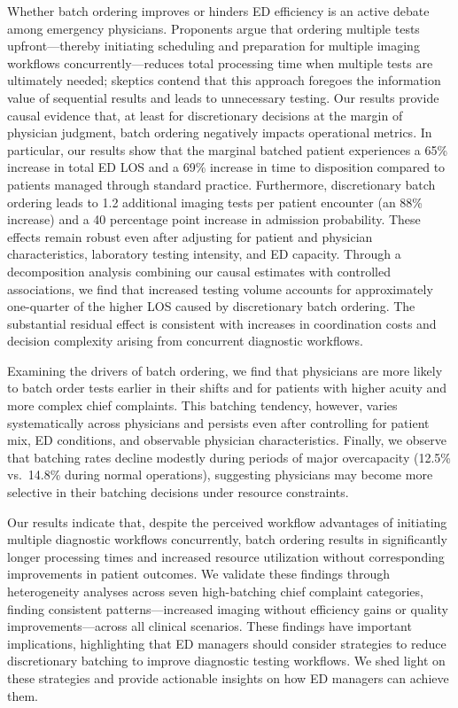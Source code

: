\documentclass[,,blindrev]{informs}
\begin{document}
Whether batch ordering improves or hinders ED efficiency is an active
debate among emergency physicians. Proponents argue that ordering
multiple tests upfront---thereby initiating scheduling and preparation
for multiple imaging workflows concurrently---reduces total processing
time when multiple tests are ultimately needed; skeptics contend that
this approach foregoes the information value of sequential results and
leads to unnecessary testing. Our results provide causal evidence that,
at least for discretionary decisions at the margin of physician
judgment, batch ordering negatively impacts operational metrics. In
particular, our results show that the marginal batched patient
experiences a 65\% increase in total ED LOS and a 69\% increase in time
to disposition compared to patients managed through standard practice.
Furthermore, discretionary batch ordering leads to 1.2 additional
imaging tests per patient encounter (an 88\% increase) and a 40
percentage point increase in admission probability. These effects remain
robust even after adjusting for patient and physician characteristics,
laboratory testing intensity, and ED capacity. Through a decomposition
analysis combining our causal estimates with controlled associations, we
find that increased testing volume accounts for approximately
one-quarter of the higher LOS caused by discretionary batch ordering.
The substantial residual effect is consistent with increases in
coordination costs and decision complexity arising from concurrent
diagnostic workflows.

Examining the drivers of batch ordering, we find that physicians are
more likely to batch order tests earlier in their shifts and for
patients with higher acuity and more complex chief complaints. This
batching tendency, however, varies systematically across physicians and
persists even after controlling for patient mix, ED conditions, and
observable physician characteristics. Finally, we observe that batching
rates decline modestly during periods of major overcapacity (12.5\%
vs.~14.8\% during normal operations), suggesting physicians may become
more selective in their batching decisions under resource constraints.

Our results indicate that, despite the perceived workflow advantages of
initiating multiple diagnostic workflows concurrently, batch ordering
results in significantly longer processing times and increased resource
utilization without corresponding improvements in patient outcomes. We
validate these findings through heterogeneity analyses across seven
high-batching chief complaint categories, finding consistent
patterns---increased imaging without efficiency gains or quality
improvements---across all clinical scenarios. These findings have
important implications, highlighting that ED managers should consider
strategies to reduce discretionary batching to improve diagnostic
testing workflows. We shed light on these strategies and provide
actionable insights on how ED managers can achieve them.
\end{document}
